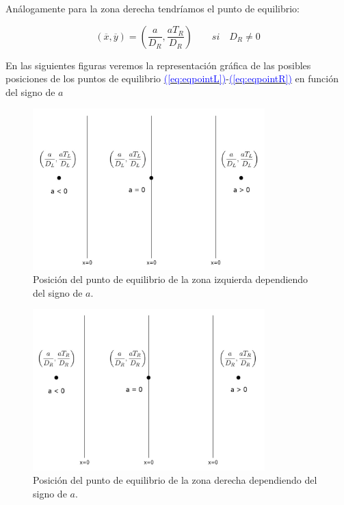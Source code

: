 \documentclass[12pt,a4paper]{report} %
\newcommand{\eref}[1]{\hyperref[#1]{\textcolor{blue}{(\ref*{#1})}}}
\newcommand{\eref}[1]{\hyperref[#1]{\textcolor{blue}{\textit{(\ref*{#1})}}}}
\begin{document}
		\vspace{0.5cm}\noindent Análogamente para la zona derecha tendríamos el punto de equilibrio:
		
		\begin{equation}
			\label{eq:eqpointR}
			\left( \overline{x},\overline{y} \right)=\left( \frac{a}{D_R},\frac{aT_R}{D_R} \right) \qquad si \quad D_R\neq0
		\end{equation}\smallskip
		
		\vspace{0.5cm} En las siguientes figuras veremos la representación gráfica de las posibles posiciones de los puntos de equilibrio \eref{eq:eqpointL}-\eref{eq:eqpointR} en función del signo de $a$
		
		\begin{figure}[h]
			\centering
			\includegraphics[width=0.8\textwidth,center]{punto.jpg}
			\caption{Posición del punto de equilibrio de la zona izquierda dependiendo del signo de $a$.}
			\label{fig:punto}	
			\centering
		\end{figure}\smallskip
		
		\newpage
		
		\begin{figure}[h]
			\includegraphics[width=0.8\textwidth,center]{puntoR.jpg}
			\caption{Posición del punto de equilibrio de la zona derecha dependiendo del signo de $a$.}
			\label{fig:puntoR}
		\end{figure}\smallskip
		
\end{document}
